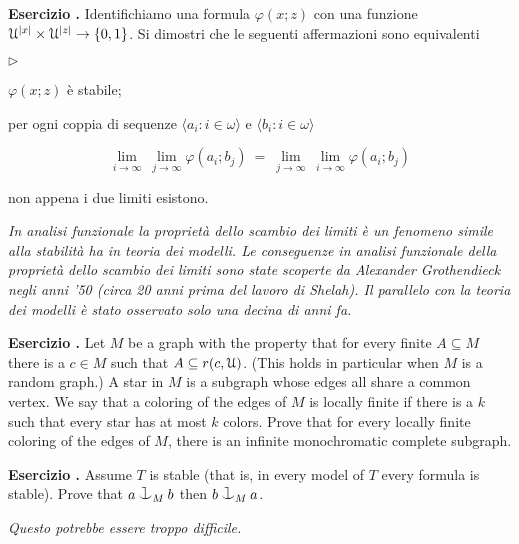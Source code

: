 \documentclass[10pt]{article}
\def\U{\EuScript U}
\def\<{\langle}
\def\>{\rangle}
\def\cnonfork{\mathbin{\raise1.8ex\rlap{\kern0.6ex\rule{0.6ex}{0.1ex}}\rlap{\kern1.1ex\rule{0.1ex}{1.9ex}}\raise-0.3ex\hbox{$\smile$} } }
\newcommand{\labella}[1]{{\sf\footnotesize #1}\hfill}
\renewenvironment{itemize}
  {\begin{list}{$\triangleright$}{%
   \setlength{\parskip}{0mm}
   \setlength{\topsep}{0mm}
   \setlength{\rightmargin}{0mm}
   \setlength{\listparindent}{0mm}
   \setlength{\itemindent}{0mm}
   \setlength{\labelwidth}{3ex}
   \setlength{\itemsep}{0mm}
   \setlength{\parsep}{0mm}
   \setlength{\partopsep}{0mm}
   \setlength{\labelsep}{1ex}
   \setlength{\leftmargin}{\labelwidth+\labelsep}
   \let\makelabel\labella}}{%
   \vspace*{-.5\baselineskip}\end{list}}
\newcounter{ex}
\newenvironment{exercise}{\addtocounter{ex}{1}\textbf{Esercizio \theex.\quad}}{}
\begin{document}
\begin{exercise}
Identifichiamo una formula $\varphi(x;z)$ con una funzione $\U^{|x|}\times\U^{|z|}\to\{0,1\}$. 
Si dimostri che le seguenti affermazioni sono equivalenti
\begin{itemize}
  \item[1.] $\varphi(x;z)$ è stabile;
  \item[2.] per ogni coppia di sequenze $\<a_i:i\in\omega\>$ e  $\<b_i:i\in\omega\>$
  
   $$\lim_{i\to\infty}\ \lim_{j\to\infty}\varphi(a_i;b_j)
   \ =\ 
   \lim_{j\to\infty}\ \lim_{i\to\infty}\varphi(a_i;b_j)$$

   non appena i due limiti esistono.
\end{itemize}
{\it In analisi funzionale la proprietà dello scambio dei limiti è un fenomeno simile alla stabilità ha in teoria dei modelli. Le conseguenze in analisi funzionale della proprietà dello scambio dei limiti sono state scoperte da Alexander Grothendieck negli anni '50 (circa 20 anni prima del lavoro di Shelah).
Il parallelo con la teoria dei modelli è stato osservato solo una decina di anni fa.}
\end{exercise}




\begin{exercise}
  Let $M$ be a graph with the property that for every finite $A\subseteq M$ there is a $c\in M$ such that $A\subseteq r(c,\U)$. 
  (This holds in particular when $M$ is a random graph.)
  A star in $M$ is a subgraph whose edges all share a common vertex. We say that a coloring of the edges of $M$ is locally finite if there is a $k$ such that every star has at most $k$ colors.
  Prove that for every locally finite coloring of the edges of $M$, there is an infinite monochromatic complete subgraph.
\end{exercise}


\begin{exercise}
 Assume $T$ is stable (that is, in every model of $T$ every formula is stable). 
 Prove that $a\cnonfork_M b$ then  $b\cnonfork_M a$.

 \textit{Questo potrebbe essere troppo difficile.}
\end{exercise}
\end{document}
